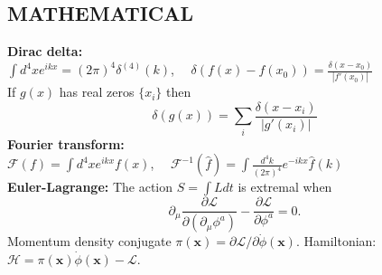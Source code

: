 \documentclass[a4paper, norsk, 8pt, landscape]{article}
\begin{document}
\begin{multicols*}{3}
\subsection*{\footnotesize MATHEMATICAL}
 {\textbf{Dirac delta:}} \\
$\int d^4 x e^{ikx} = (2\pi)^4\delta^{(4)}(k)$, \ \
$\delta(f(x)-f(x_0))=\frac{\delta(x-x_0)}{|f'(x_0)|}$ \\
If $g(x)$ has real zeros $\{x_i\}$ then
\[\delta(g(x))=\sum_i \frac{\delta(x-x_i)}{|g'(x_i)|}\]
 {\textbf{Fourier transform:}} \\
$\mathcal{F}(f)=\int d^4xe^{ikx}f(x)$, \ \
$\mathcal{F}^{-1}(\hat{f})=\int \frac{d^4k}{(2\pi)^4}e^{-ikx}\hat{f}(k)$
 \\
 {\textbf{Euler-Lagrange:}}
The action $S=\int L dt$ is extremal when \\
\[
\partial_\mu \frac{\partial \mathcal{L}}{\partial (\partial_\mu \phi^a)}
- \frac{\partial \mathcal{L}}{\partial \phi^a }=0.
\]
Momentum density conjugate $\pi(\mathbf{x})=\partial \mathcal{L}/\partial \dot \phi(\mathbf{x})$.
Hamiltonian: $\mathcal{H}=\pi(\mathbf{x})\dot{\phi}(\mathbf{x})-\mathcal{L}$.


















\end{multicols*}
\end{document}
